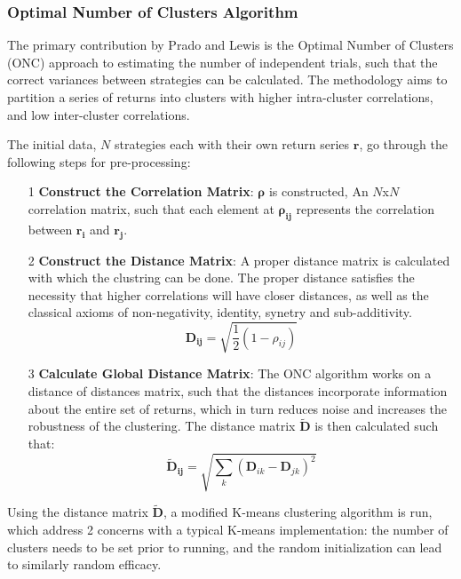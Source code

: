 \documentclass[a4paper,11pt,oneside]{article}
\theoremstyle{plain}
\theoremstyle{definition}
\begin{document}
	\subsubsection{Optimal Number of Clusters Algorithm}\label{imp_onc}
	
	The primary contribution by Prado and Lewis is the Optimal Number of Clusters (ONC) approach to estimating the number of independent trials, such that the correct variances between strategies can be calculated. The methodology aims to partition a series of returns into clusters with higher intra-cluster correlations, and low inter-cluster correlations. \newline
	
	The initial data, $N$ strategies each with their own return series $\mathbf{r}$, go through the following steps for pre-processing:
		
	\begin{itemize}
		\item [1] \textbf{Construct the Correlation Matrix}: $\mathbf{\rho}$ is constructed, An $N$x$N$ correlation matrix, such that each element at $\mathbf{\rho_{ij}}$ represents the correlation between $\mathbf{r_i}$ and $\mathbf{r_j}$.
		\newline
		\item [2] \textbf{Construct the Distance Matrix}: A proper distance matrix is calculated with which the clustring can be done. The proper distance satisfies the necessity that higher correlations will  have closer distances, as well as the classical axioms of non-negativity, identity, synetry and sub-additivity.
		\begin{equation}
			\mathbf{D_{ij}} = \sqrt{\frac{1}{2}\left(1 - \rho_{ij}\right)}
		\end{equation} 
		\item[3] \textbf{Calculate Global Distance Matrix}: The ONC algorithm works on a distance of distances matrix, such that the distances incorporate information about the entire set of returns, which in turn reduces noise and increases the robustness of the clustering\cite{LopezPrado2016a}. The distance matrix $\mathbf{\tilde{D}}$ is then calculated such that:
				\begin{equation}
				\mathbf{\tilde{D}_{ij}} = \sqrt{\sum_{k}\left(\mathbf{D}_{ik} - \mathbf{D}_{jk}\right)^2}
				\end{equation} 
	\end{itemize}
	
	Using the distance matrix $\mathbf{\tilde{D}}$, a modified K-means clustering algorithm is run, which address 2 concerns with a typical K-means implementation: the number of clusters needs to be set prior to running, and the random initialization can lead to similarly random efficacy. \newline
	
\end{document}
